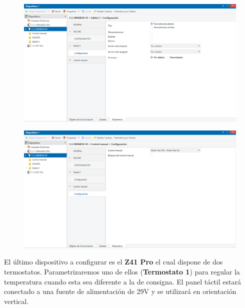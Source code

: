 \documentclass[10pt]{article}
\begin{document}
\begin{figure}[H]
	\begin{center}
	 		\includegraphics[width = 1.00\textwidth]{Imagenes/img22}
	\end{center} 
\end{figure}

\begin{figure}[H]
	\begin{center}
	 		\includegraphics[width = 1.00\textwidth]{Imagenes/img23}
	\end{center} 
\end{figure}

El último dispositivo a configurar es el \textbf{Z41 Pro} el cual dispone de dos termostatos. Parametrizaremos uno de ellos (\textbf{Termostato 1}) para regular la temperatura cuando esta sea diferente a la de consigna. El panel táctil estará conectado a una fuente de alimentación de 29V y se utilizará en orientación vertical. \\
\end{document}
